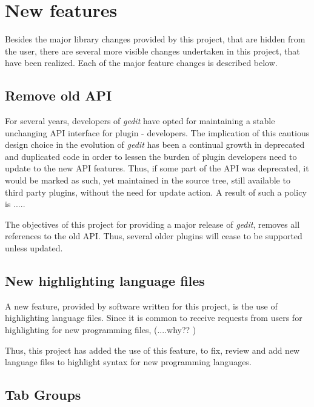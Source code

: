 
\section{New features}\label{sec:NewFeatures}

Besides the major library changes provided by this project, that are hidden from the 
user, there are several more visible changes undertaken in this project, that have been 
realized.  Each of the major feature changes is described below.


\subsection{Remove old API}\label{sec:RemoveOldAPI}

For several years, developers of \emph{gedit} have opted for maintaining a stable unchanging 
API interface for plugin - developers. The implication of this cautious design choice in the 
evolution of \emph{gedit} has been a continual growth in deprecated and duplicated code 
in order to lessen the burden of plugin developers need to update to the new API features. 
Thus, if some part of the API was deprecated, it would be marked as such, yet maintained 
in the source tree, still available to third party plugins, without the need for update action.
A result of such a policy is .....

The objectives of this project for providing a major release of \emph{gedit}, removes 
all references to the old API.  Thus, several older plugins will cease to be supported 
unless updated.


\subsection{New highlighting language files}\label{sec:HighFiles}

A new feature, provided by software written for this project, is the use of 
highlighting language files.   Since it is common to receive requests from 
users for highlighting for new programming files, (....why?? )

Thus, this project has added the use of this feature, to fix, review and 
add new language files to highlight syntax for new programming languages.


\subsection{Tab Groups}\label{sec:TabGroups}

